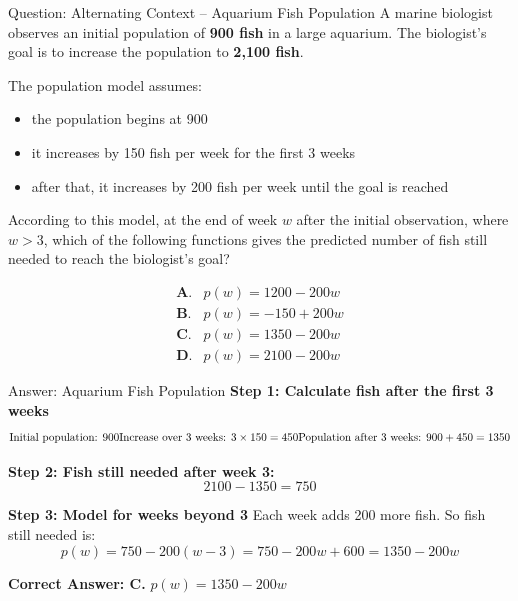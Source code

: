 \documentclass{beamer}
\begin{document}
\begin{frame}{Question: Alternating Context – Aquarium Fish Population}
    A marine biologist observes an initial population of \textbf{900 fish} in a large aquarium.  
    The biologist’s goal is to increase the population to \textbf{2,100 fish}.  

    The population model assumes:
    \begin{itemize}
        \item the population begins at 900
        \item it increases by 150 fish per week for the first 3 weeks
        \item after that, it increases by 200 fish per week until the goal is reached
    \end{itemize}

    According to this model, at the end of week \(w\) after the initial observation, where \(w > 3\),  
    which of the following functions gives the predicted number of fish still needed to reach the biologist’s goal?

    \[
    \begin{array}{ll}
    \textbf{A.} & p(w) = 1200 - 200w \\
    \textbf{B.} & p(w) = -150 + 200w \\
    \textbf{C.} & p(w) = 1350 - 200w \\
    \textbf{D.} & p(w) = 2100 - 200w
    \end{array}
    \]
\end{frame}


\begin{frame}{Answer: Aquarium Fish Population}
    \textbf{Step 1: Calculate fish after the first 3 weeks}  
    \[
    \text{Initial population: } 900 \\
    \text{Increase over 3 weeks: } 3 \times 150 = 450 \\
    \text{Population after 3 weeks: } 900 + 450 = 1350
    \]

    \textbf{Step 2: Fish still needed after week 3:}  
    \[
    2100 - 1350 = 750
    \]

    \textbf{Step 3: Model for weeks beyond 3}  
    Each week adds 200 more fish. So fish still needed is:
    \[
    p(w) = 750 - 200(w - 3) = 750 - 200w + 600 = 1350 - 200w
    \]


    \textbf{Correct Answer: C.} \(p(w) = 1350 - 200w\)
\end{frame}
\end{document}
